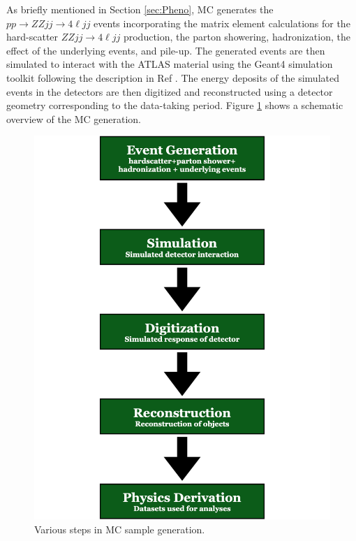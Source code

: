 As briefly mentioned in Section \ref{sec:Pheno}, MC generates the $pp \rightarrow ZZjj\rightarrow 4\ell jj$ events incorporating the matrix element calculations for the hard-scatter $ZZjj\rightarrow 4\ell jj$ production, the parton showering, hadronization, the effect of the underlying events, and pile-up. The generated events are then simulated to interact with the ATLAS material using the Geant4 simulation toolkit following the description in Ref \cite{GEANT4}. The energy deposits of the simulated events in the detectors are then digitized and reconstructed using a detector geometry corresponding to the data-taking period. Figure \ref{fig:MCGenerationSchematic} shows a schematic overview of the MC generation.
\begin{figure}
\centering
\includegraphics[width=.8\linewidth]{figures/AnalysisOverview/MCSchematic.pdf}  
  \caption{Various steps in MC sample generation.}
\label{fig:MCGenerationSchematic}
\end{figure}

